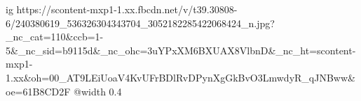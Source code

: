  
 
 
 
 

\ifcmt
  ig https://scontent-mxp1-1.xx.fbcdn.net/v/t39.30808-6/240380619_536326304343704_3052182285422068424_n.jpg?_nc_cat=110&ccb=1-5&_nc_sid=b9115d&_nc_ohc=3uYPxXM6BXUAX8VlbnD&_nc_ht=scontent-mxp1-1.xx&oh=00_AT9LEiUoaV4KvUFrBDlRvDPynXgGkBvO3LmwdyR_qJNBww&oe=61B8CD2F
  @width 0.4
\fi
